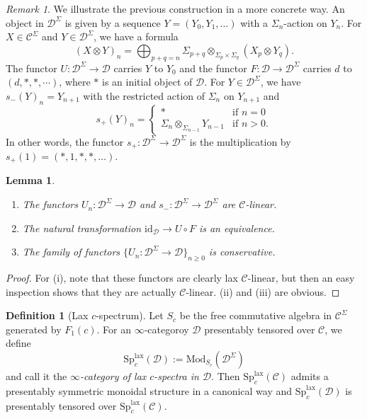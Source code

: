 \documentclass{amsart}
\theoremstyle{plain}
\newtheorem{lemma}[theorem]{Lemma}
\theoremstyle{definition}
\newtheorem{definition}[theorem]{Definition}
\theoremstyle{remark}
\newtheorem{remark}[theorem]{Remark}
\numberwithin{equation}{theorem}
\newcommand{\mcal}[1]{\mathcal{#1}}
\newcommand{\Mod}{\mathrm{Mod}}
\newcommand{\Sp}{\mathrm{Sp}}
\newcommand{\id}{\mathrm{id}}
\newcommand{\lax}{\mathrm{lax}}
\begin{document}
\begin{remark}
We illustrate the previous construction in a more concrete way.
An object in $\mcal{D}^\Sigma$ is given by a sequence $Y=(Y_0,Y_1,\dotsc)$ with a $\Sigma_n$-action on $Y_n$.
For $X\in\mcal{C}^\Sigma$ and $Y\in\mcal{D}^\Sigma$, we have a formula
\[
	(X\otimes Y)_n = \bigoplus_{p+q=n} \Sigma_{p+q}\otimes_{\Sigma_p\times\Sigma_q}(X_p\otimes Y_q).
\]
The functor $U\colon\mcal{D}^\Sigma\to\mcal{D}$ carries $Y$ to $Y_0$ and the functor $F\colon\mcal{D}\to\mcal{D}^\Sigma$ carries $d$ to $(d,*,*,\cdots)$, where $*$ is an initial object of $\mcal{D}$.
For $Y\in\mcal{D}^\Sigma$, we have $s_-(Y)_n=Y_{n+1}$ with the restricted action of $\Sigma_n$ on $Y_{n+1}$ and 
\[
	s_+(Y)_n =
	\begin{cases}
		* &\text{if }n=0 \\
		\Sigma_n\otimes_{\Sigma_{n-1}}Y_{n-1} &\text{if }n>0.
	\end{cases}
\]
In other words, the functor $s_+\colon\mcal{D}^\Sigma\to\mcal{D}^\Sigma$ is the multiplication by $s_+(1)=(*,1,*,*,\dotsc)$.
\end{remark}

\begin{lemma}\label{lem:cSp}
\leavevmode
\begin{enumerate}
\item The functors $U_n\colon\mcal{D}^\Sigma\to\mcal{D}$ and $s_-\colon\mcal{D}^\Sigma\to\mcal{D}^\Sigma$ are $\mcal{C}$-linear.
\item The natural transformation $\id_\mcal{D}\to U\circ F$ is an equivalence.
\item The family of functors $\{U_n\colon\mcal{D}^\Sigma\to\mcal{D}\}_{n\ge 0}$ is conservative.
\end{enumerate}
\end{lemma}
\begin{proof}
For (i), note that these functors are clearly lax $\mcal{C}$-linear, but then an easy inspection shows that they are actually $\mcal{C}$-linear.
(ii) and (iii) are obvious.
\end{proof}

\begin{definition}[Lax $c$-spectrum]\label{def:cSp}
Let $S_c$ be the free commutative algebra in $\mcal{C}^\Sigma$ generated by $F_1(c)$.
For an $\infty$-categoroy $\mcal{D}$ presentably tensored over $\mcal{C}$, we define
\[
	\Sp^\lax_c(\mcal{D}) := \Mod_{S_c}(\mcal{D}^\Sigma)
\]
and call it the \textit{$\infty$-category of lax $c$-spectra in $\mcal{D}$}.
Then $\Sp^\lax_c(\mcal{C})$ admits a presentably symmetric monoidal structure in a canonical way and $\Sp^\lax_c(\mcal{D})$ is presentably tensored over $\Sp^\lax_c(\mcal{C})$.
\end{definition}
\end{document}
